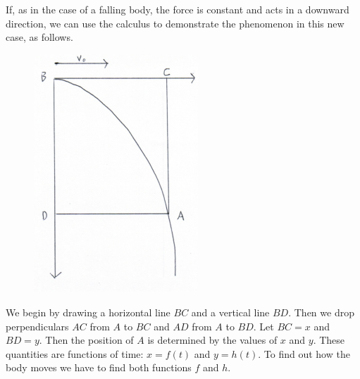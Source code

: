 \documentclass[twoside,openright]{article}
\begin{document}
If, as in the case of a falling body, the force is constant and acts
in a downward direction, we can use the calculus to demonstrate the
phenomenon in this new case, as follows.
\begin{figure}[htp]
  \begin{center}
    \includegraphics[width=0.55\textwidth]{fig/Figure81}
    \caption{}
  \end{center}
\end{figure}

We begin by drawing a horizontal line $BC$ and a vertical line $BD$.
Then we drop perpendiculars $AC$ from $A$ to $BC$ and $AD$ from $A$ to
$BD$.  Let $BC = x$ and $BD = y$.  Then the position of $A$ is
determined by the values of $x$ and $y$.  These quantities are
functions of time: $x =f(t)$ and $y =h(t)$.  To find out how the body
moves we have to find both functions $f$ and $h$.
\end{document}
